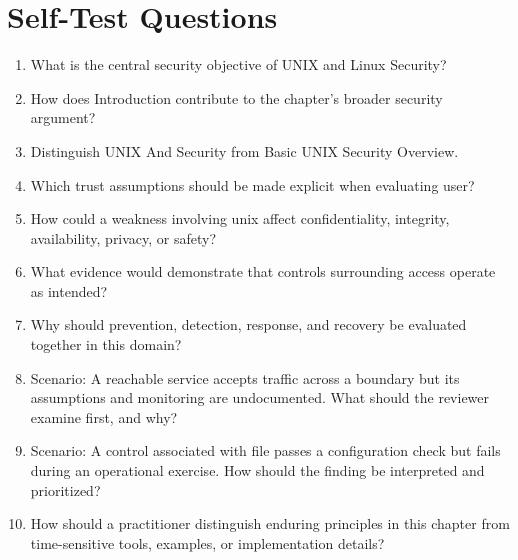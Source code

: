 \documentclass[11pt]{article}
\begin{document}
\section*{Self-Test Questions}
\begin{enumerate}
\item What is the central security objective of UNIX and Linux Security?
\item How does Introduction contribute to the chapter's broader security argument?
\item Distinguish UNIX And Security from Basic UNIX Security Overview.
\item Which trust assumptions should be made explicit when evaluating user?
\item How could a weakness involving unix affect confidentiality, integrity, availability, privacy, or safety?
\item What evidence would demonstrate that controls surrounding access operate as intended?
\item Why should prevention, detection, response, and recovery be evaluated together in this domain?
\item Scenario: A reachable service accepts traffic across a boundary but its assumptions and monitoring are undocumented. What should the reviewer examine first, and why?
\item Scenario: A control associated with file passes a configuration check but fails during an operational exercise. How should the finding be interpreted and prioritized?
\item How should a practitioner distinguish enduring principles in this chapter from time-sensitive tools, examples, or implementation details?
\end{enumerate}
\end{document}
